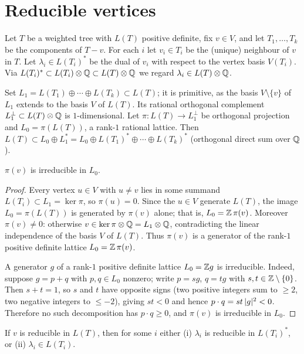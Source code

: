 \section{Reducible vertices}
\label{sec:reducible}

Let $T$ be a weighted tree with $L(T)$ positive definite, fix $v\in V$, and let
$T_1,\dots,T_k$ be the components of $T-v$.  For each $i$ let $v_i\in T_i$ be the (unique)
neighbour of $v$ in $T$.  Let $\lambda_i\in L(T_i)^\ast$ be the dual of $v_i$ with respect to
the vertex basis $V(T_i)$.  Via $L(T_i)^\ast\subset L(T_i)\otimes\mathbb{Q}\subset L(T)\otimes\mathbb{Q}$
we regard $\lambda_i\in L(T)\otimes\mathbb{Q}$.

Set $L_1=L(T_1)\oplus\cdots\oplus L(T_k)\subset L(T)$; it is primitive, as the basis
$V\setminus\{v\}$ of $L_1$ extends to the basis $V$ of $L(T)$.  Its rational orthogonal
complement $L_1^\perp\subset L(T)\otimes\mathbb{Q}$ is $1$-dimensional.  Let
$\pi:L(T)\to L_1^\perp$ be orthogonal projection and $L_0=\pi(L(T))$, a rank-$1$ rational
lattice.  Then $L(T)\subset L_0\oplus L_1^\ast=L_0\oplus L(T_1)^\ast\oplus\cdots\oplus
L(T_k)^\ast$ (orthogonal direct sum over $\mathbb{Q}$).

\begin{lem}
\label{lem:irred}
$\pi(v)$ is irreducible in $L_0$.
\end{lem}

\begin{proof}
Every vertex $u\in V$ with $u\ne v$ lies in some summand $L(T_i)\subset L_1=\ker\pi$, so
$\pi(u)=0$.  Since the $u\in V$ generate $L(T)$, the image $L_0=\pi(L(T))$ is generated by
$\pi(v)$ alone; that is, $L_0=\mathbb{Z}\,\pi(v)$.  Moreover $\pi(v)\ne0$: otherwise
$v\in\ker\pi\otimes\mathbb{Q}=L_1\otimes\mathbb{Q}$, contradicting the linear independence of the basis
$V$ of $L(T)$.  Thus $\pi(v)$ is a generator of the rank-$1$ positive definite lattice
$L_0=\mathbb{Z}\,\pi(v)$.

A generator $g$ of a rank-$1$ positive definite lattice $L_0=\mathbb{Z} g$ is irreducible.  Indeed,
suppose $g=p+q$ with $p,q\in L_0$ nonzero; write $p=sg$, $q=tg$ with $s,t\in\mathbb{Z}\setminus\{0\}$.
Then $s+t=1$, so $s$ and $t$ have opposite signs (two positive integers sum to $\ge2$, two
negative integers to $\le-2$), giving $st<0$ and hence $p\cdot q=st\,\lvert g\rvert^{2}<0$.  Therefore no
such decomposition has $p\cdot q\ge0$, and $\pi(v)$ is irreducible in $L_0$.
\end{proof}

\begin{lem}
\label{lem:dichotomy}
If $v$ is reducible in $L(T)$, then for some $i$ either
\textup{(i)} $\lambda_i$ is reducible in $L(T_i)^\ast$, or \textup{(ii)} $\lambda_i\in L(T_i)$.
\end{lem}

